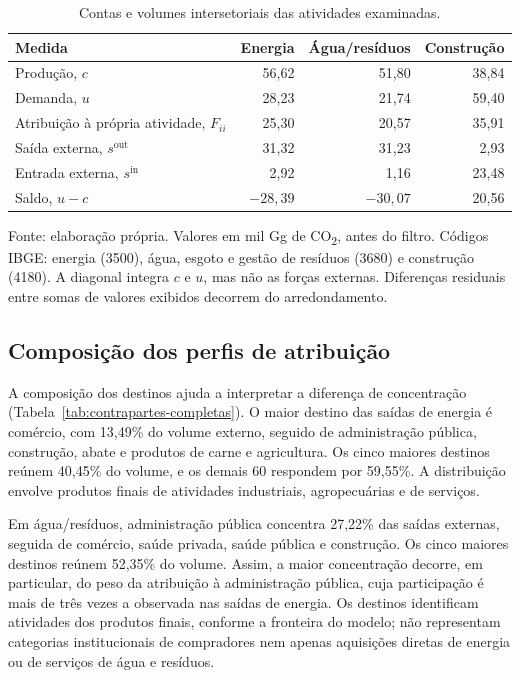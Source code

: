 \begin{table}[!ht]
\centering
\caption{Contas e volumes intersetoriais das atividades examinadas.}
\label{tab:contas-energia-construcao}
\small
\begin{tabular}{@{}lrrr@{}}
\toprule
Medida & Energia & Água/resíduos & Construção \\
\midrule
Produção, $c$ & 56,62 & 51,80 & 38,84 \\
Demanda, $u$ & 28,23 & 21,74 & 59,40 \\
Atribuição à própria atividade, $F_{ii}$ & 25,30 & 20,57 & 35,91 \\
Saída externa, $s^{\mathrm{out}}$ & 31,32 & 31,23 & 2,93 \\
Entrada externa, $s^{\mathrm{in}}$ & 2,92 & 1,16 & 23,48 \\
Saldo, $u-c$ & $-28,39$ & $-30,07$ & 20,56 \\
\bottomrule
\end{tabular}
\par\smallskip\begin{minipage}{\textwidth}\footnotesize
Fonte: elaboração própria. Valores em mil Gg de CO\textsubscript{2}, antes do filtro. Códigos IBGE: energia (3500), água, esgoto e gestão de resíduos (3680) e construção (4180). A diagonal integra $c$ e $u$, mas não as forças externas. Diferenças residuais entre somas de valores exibidos decorrem do arredondamento.
\end{minipage}
\end{table}





\subsection{Composição dos perfis de atribuição}
\label{sec:composicao-perfis}

A composição dos destinos ajuda a interpretar a diferença de concentração (Tabela~\ref{tab:contrapartes-completas}). O maior destino das saídas de energia é comércio, com 13,49\% do volume externo, seguido de administração pública, construção, abate e produtos de carne e agricultura. Os cinco maiores destinos reúnem 40,45\% do volume, e os demais 60 respondem por 59,55\%. A distribuição envolve produtos finais de atividades industriais, agropecuárias e de serviços.

Em água/resíduos, administração pública concentra 27,22\% das saídas externas, seguida de comércio, saúde privada, saúde pública e construção. Os cinco maiores destinos reúnem 52,35\% do volume. Assim, a maior concentração decorre, em particular, do peso da atribuição à administração pública, cuja participação é mais de três vezes a observada nas saídas de energia. Os destinos identificam atividades dos produtos finais, conforme a fronteira do modelo; não representam categorias institucionais de compradores nem apenas aquisições diretas de energia ou de serviços de água e resíduos.

